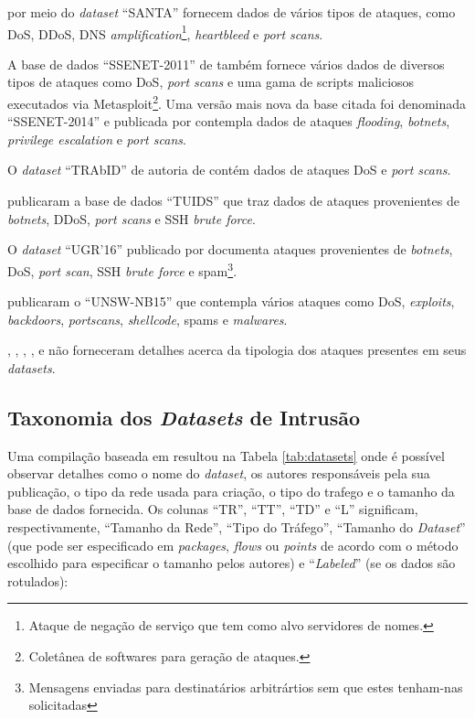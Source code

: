  por meio do \textit{dataset} ``SANTA'' fornecem dados de vários tipos de ataques, como DoS, DDoS, DNS \textit{amplification}\footnote{Ataque de negação de serviço que tem como alvo servidores de nomes.}, \textit{heartbleed} e \textit{port scans}.

A base de dados ``SSENET-2011'' de  também fornece vários dados de diversos tipos de ataques como DoS, \textit{port scans} e uma gama de scripts maliciosos executados via Metasploit\footnote{Coletânea de softwares para geração de ataques.}. Uma versão mais nova da base citada foi denominada ``SSENET-2014'' e publicada por  contempla dados de ataques \textit{flooding}, \textit{botnets}, \textit{privilege escalation} e \textit{port scans}.

O \textit{dataset} ``TRAbID'' de autoria de  contém dados de ataques DoS e \textit{port scans}.

 publicaram a base de dados ``TUIDS'' que traz dados de ataques provenientes de \textit{botnets}, DDoS, \textit{port scans} e SSH \textit{brute force}.

O \textit{dataset} ``UGR'16'' publicado por  documenta ataques provenientes de \textit{botnets}, DoS, \textit{port scan}, SSH \textit{brute force} e spam\footnote{Mensagens enviadas para destinatários arbitrártios sem que estes tenham-nas solicitadas}.

 publicaram o ``UNSW-NB15'' que contempla vários ataques como DoS, \textit{exploits}, \textit{backdoors}, \textit{portscans}, \textit{shellcode}, spams e \textit{malwares}.

, , , ,   e  não forneceram detalhes acerca da tipologia dos ataques presentes em seus \textit{datasets}.

\subsection{Taxonomia dos \textit{Datasets} de Intrusão}
\label{tax_datasets}
Uma compilação baseada em  resultou na Tabela \ref{tab:datasets} onde é possível observar detalhes como o nome do \textit{dataset}, os autores responsáveis pela sua publicação, o tipo da rede usada para criação, o tipo do trafego e o tamanho da base de dados fornecida. Os colunas ``TR'', ``TT'', ``TD'' e ``L'' significam, respectivamente, ``Tamanho da Rede'', ``Tipo do Tráfego'', ``Tamanho do \textit{Dataset}'' (que pode ser especificado em \textit{packages}, \textit{flows} ou \textit{points} de acordo com o método escolhido para especificar o tamanho pelos autores) e ``\textit{Labeled}'' (se os dados são rotulados):




